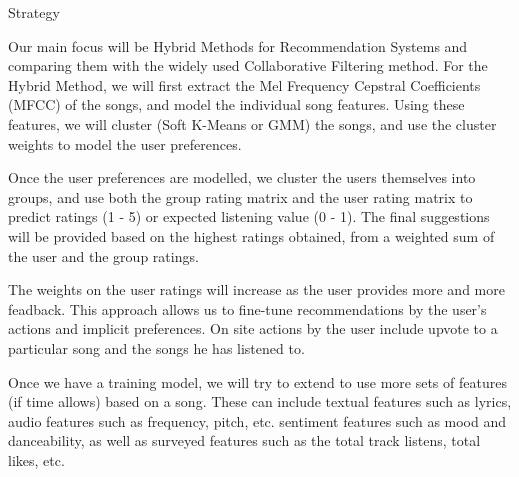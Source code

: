 \documentclass[11pt]{article}
\begin{document}
\begin{psection}{Strategy}

    Our main focus will be Hybrid Methods for Recommendation Systems and comparing them with the widely used Collaborative Filtering method. For the Hybrid Method, we will first extract the Mel Frequency Cepstral Coefficients (MFCC) of the songs, and model the individual song features. Using these features, we will cluster (Soft K-Means or GMM) the songs, and use the cluster weights to model the user preferences. \br
    
    Once the user preferences are modelled, we cluster the users themselves into groups, and use both the group rating matrix and the user rating matrix to predict ratings (1 - 5) or expected listening value (0 - 1). The final suggestions will be provided based on the highest ratings obtained, from a weighted sum of the user and the group ratings. \br

    The weights on the user ratings will increase as the user provides more and more feadback. This approach allows us to fine-tune recommendations by the user’s actions and implicit preferences. On site actions by the user include upvote to a particular song and the songs he has listened to. \br

    Once we have a training model, we will try to extend to use more sets of features (if time allows) based on a song. These can include textual features such as lyrics, audio features such as frequency, pitch, etc. sentiment features such as mood and danceability, as well as surveyed features such as the total track listens, total likes, etc. \br

\end{psection}



\end{document}
